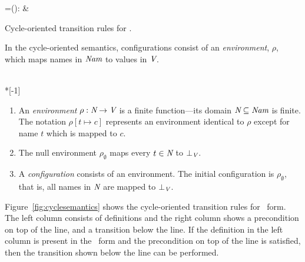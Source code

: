 \documentclass[12pt,titlepage,twoside]{article}
\begin{document}
\begin{myfigure}[t]
\begin{transitions}
\footnotesize %
=\xi():
& \footnotesize %
  \trule{\rho[t'_{n+1}]\succ\bot \wedge \ldots \wedge \rho[t'_m]\succ\bot}
        { } \\
\end{transitions}
\caption{Cycle-oriented transition rules for \ssiplus.}
\label{fig:cyclesemantics}
\end{myfigure}

In the cycle-oriented semantics, configurations consist of an
\emph{environment}, $\rho$, which maps
names in ${\mbox{\em Nam}}$ to values in ${\mbox{\em V}}$.

\begin{definition}~\\*[-1\baselineskip]
\begin{enumerate}
\item An \emph{environment} $\rho: {\mbox{\em N}} \to {\mbox{\em V}}$ is a
finite function---its domain ${\mbox{\em N}} \subseteq {\mbox{\em Nam}}$ is
finite.  The notation $\rho[t\mapsto c]$ represents an environment
identical to $\rho$ except for name $t$ which is mapped to $c$.
\item The null environment $\rho_\emptyset$ maps every $t\in{\mbox{\em N}}$ to
$\bot_{\mbox{\scriptsize\em V}}$.
\item A \emph{configuration} consists of an environment.  The initial
configuration is $\rho_\emptyset$, that is, all names in ${\mbox{\em N}}$
are mapped to $\bot_{\mbox{\scriptsize\em V}}$.
\end{enumerate}
\end{definition}

Figure~\vref{fig:cyclesemantics} shows the cycle-oriented transition
rules for \ssiplus\ form.  The left column consists of definitions and
the right column shows a precondition on top of the line, and a
transition below the line.  If the definition in the left column is
present in the \ssiplus\ form and the precondition on top of the line
is satisfied, then the transition shown below the line can be performed.
\end{document}
